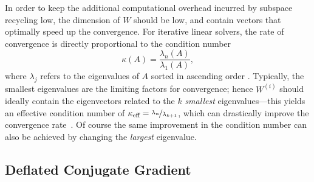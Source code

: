 \documentclass{article}
\begin{document}
 In order to keep the additional computational overhead incurred by subspace recycling low, the dimension of $W$ should be low, and contain vectors that optimally speed up the convergence. For iterative linear solvers, the rate of convergence is directly proportional to the condition number 
\begin{equation}
\kappa (A)=\frac{\lambda_{n}(A)}{\lambda_{1}(A)},
\end{equation} 
where $\lambda_j$ refers to the eigenvalues of $A$ sorted in ascending order \cite{nocedal06}. Typically, the smallest eigenvalues are the limiting factors for convergence; hence $W^{(i)}$ should ideally contain the eigenvectors related to the $k$ \emph{smallest} eigenvalues---this yields an effective condition number of $\kappa_{\text{eff}} = \nicefrac{\lambda_{n}}{\lambda_{k+1}}$, which can drastically improve the convergence rate~\cite{saad11,ebadi16}. Of course the same improvement in the condition number can also be achieved by changing the \emph{largest} eigenvalue.

\subsection{Deflated Conjugate Gradient}
\label{sec:def_cg}
\end{document}
